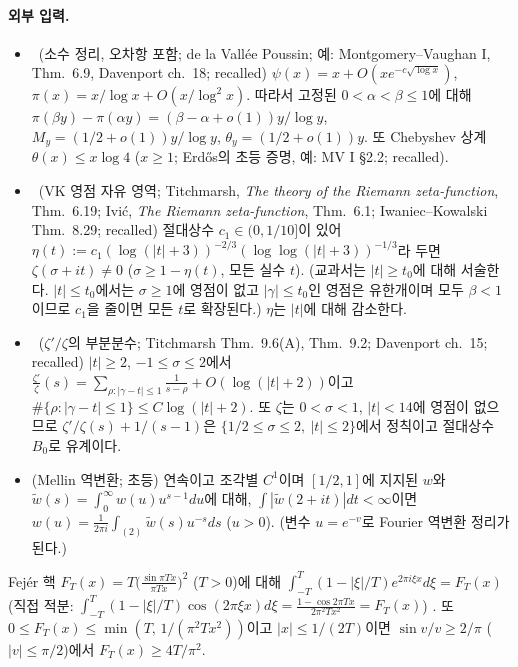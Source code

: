 \paragraph{외부 입력.}
\begin{itemize}[leftmargin=2em]
\item[(E1)] \EXT\ (소수 정리, 오차항 포함; de la Vallée Poussin; 예: Montgomery--Vaughan I, Thm.~6.9,
Davenport ch.~18; recalled) $\psi(x)=x+O(xe^{-c\sqrt{\log x}})$, $\pi(x)=x/\log x+O(x/\log^2x)$.
따라서 고정된 $0<\alpha<\beta\le 1$에 대해 $\pi(\beta y)-\pi(\alpha y)=(\beta-\alpha+o(1))y/\log y$,
$M_y=(1/2+o(1))y/\log y$, $\theta_y=(1/2+o(1))y$.
또 Chebyshev 상계 $\theta(x)\le x\log 4$ ($x\ge1$; Erdős의 초등 증명, 예: MV I \S2.2; recalled).
\item[(E2)] \EXT\ (VK 영점 자유 영역; Titchmarsh, \emph{The theory of the Riemann zeta-function}, Thm.~6.19;
Ivić, \emph{The Riemann zeta-function}, Thm.~6.1; Iwaniec--Kowalski Thm.~8.29; recalled)
절대상수 $c_1\in(0,1/10]$이 있어 $\eta(t):=c_1(\log(|t|+3))^{-2/3}(\log\log(|t|+3))^{-1/3}$라 두면
$\zeta(\sigma+it)\ne0$ ($\sigma\ge1-\eta(t)$, 모든 실수 $t$).
(교과서는 $|t|\ge t_0$에 대해 서술한다. $|t|\le t_0$에서는 $\sigma\ge1$에 영점이 없고 $|\gamma|\le t_0$인 영점은 유한개이며
모두 $\beta<1$이므로 $c_1$을 줄이면 모든 $t$로 확장된다.) $\eta$는 $|t|$에 대해 감소한다.
\item[(E3)] \EXT\ ($\zeta'/\zeta$의 부분분수; Titchmarsh Thm.~9.6(A), Thm.~9.2; Davenport ch.~15; recalled)
$|t|\ge2$, $-1\le\sigma\le2$에서 $\frac{\zeta'}{\zeta}(s)=\sum_{\rho:|\gamma-t|\le1}\frac1{s-\rho}+O(\log(|t|+2))$이고
$\#\{\rho:|\gamma-t|\le1\}\le C\log(|t|+2)$.
또 $\zeta$는 $0<\sigma<1$, $|t|<14$에 영점이 없으므로 $\zeta'/\zeta(s)+1/(s-1)$은
$\{1/2\le\sigma\le2,\ |t|\le2\}$에서 정칙이고 절대상수 $B_0$로 유계이다.
\item[(E4)] (Mellin 역변환; 초등) 연속이고 조각별 $C^1$이며 $[1/2,1]$에 지지된 $w$와 $\tilde w(s)=\int_0^\infty w(u)u^{s-1}du$에 대해,
$\int|\tilde w(2+it)|dt<\infty$이면 $w(u)=\frac1{2\pi i}\int_{(2)}\tilde w(s)u^{-s}ds$ ($u>0$).
(변수 $u=e^{-v}$로 Fourier 역변환 정리가 된다.)
\end{itemize}
Fejér 핵 $F_T(x)=T\big(\frac{\sin \pi Tx}{\pi Tx}\big)^2$ ($T>0$)에 대해
$\int_{-T}^{T}(1-|\xi|/T)e^{2\pi i\xi x}d\xi=F_T(x)$ (직접 적분: $\int_{-T}^T(1-|\xi|/T)\cos(2\pi\xi x)d\xi
=\frac{1-\cos 2\pi Tx}{2\pi^2Tx^2}=F_T(x)$) \PROVED. 또 $0\le F_T(x)\le \min(T,\,1/(\pi^2Tx^2))$이고
$|x|\le 1/(2T)$이면 $\sin v/v\ge 2/\pi$ ($|v|\le\pi/2$)에서 $F_T(x)\ge 4T/\pi^2$.

